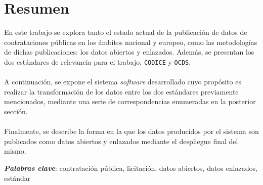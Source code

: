 \vspace*{15em}
\section*{Resumen}
    \vspace{0.5cm}
    \begin{adjustwidth}{50pt}{50pt}
        \hspace{15pt} En este trabajo se explora tanto el estado actual de la publicación de datos de contrataciones públicas en los ámbitos nacional y europeo, como las metodologías de dichas publicaciones: los datos abiertos y enlazados. Además, se presentan los dos estándares de relevancia para el trabajo, \texttt{CODICE} y \texttt{OCDS}.
        \\ \\
        \indent A continuación, se expone el sistema \textit{software} desarrollado cuyo propósito es realizar la transformación de los datos entre los dos estándares previamente mencionados, mediante una serie de correspondencias enumeradas en la posterior sección.
        \\ \\
        \indent Finalmente, se describe la forma en la que los datos producidos por el sistema son publicados como datos abiertos y enlazados mediante el despliegue final del mismo.
    \end{adjustwidth}
    \vspace{1cm}
    \textbf{\textit{Palabras clave}}: contratación pública, licitación, datos abiertos, datos enlazados, estándar

{}

\newpage
